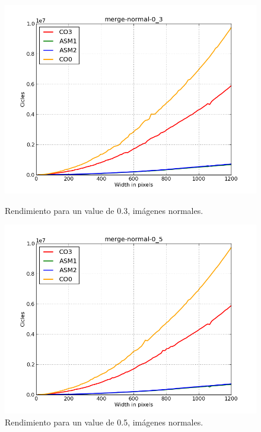 \documentclass[a4paper]{article}
\begin{document}
\begin{figure}[H]
	\begin{center}
		\includegraphics[scale=0.4]{../tp2-bundle.v2/Testing/plots/all/merge-normal-03--all.png}
		\caption{Rendimiento para un value de 0.3, imágenes normales.}
		\label{fig:exp1-1}
	\end{center}
	\endminipage\hfill
	\begin{center}
		\includegraphics[scale=0.4]{../tp2-bundle.v2/Testing/plots/all/merge-normal-05--all.png}
		\caption{Rendimiento para un value de 0.5, imágenes normales.}
		\label{fig:exp1-0.5}
	\end{center}
	\endminipage\hfill

\end{figure}
\end{document}
